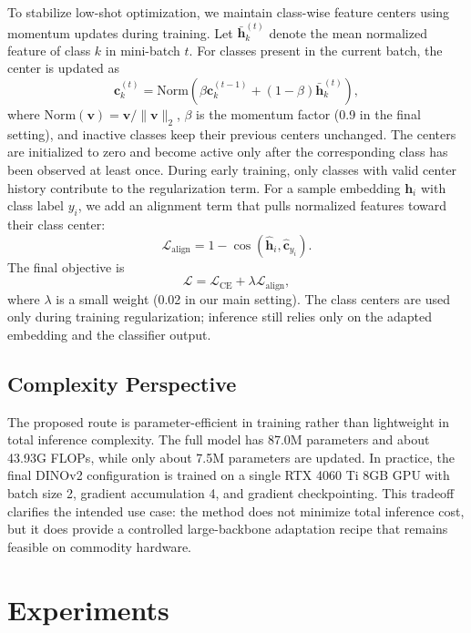 \documentclass[a4paper,fleqn]{cas-sc}
\begin{document}
To stabilize low-shot optimization, we maintain class-wise feature centers using momentum updates during training. Let $\bar{\mathbf{h}}_k^{(t)}$ denote the mean normalized feature of class $k$ in mini-batch $t$. For classes present in the current batch, the center is updated as
\begin{equation}
\mathbf{c}_k^{(t)} = \text{Norm}\left(\beta \mathbf{c}_k^{(t-1)} + (1-\beta)\bar{\mathbf{h}}_k^{(t)}\right),
\end{equation}
where $\text{Norm}(\mathbf{v})=\mathbf{v}/\|\mathbf{v}\|_2$, $\beta$ is the momentum factor (0.9 in the final setting), and inactive classes keep their previous centers unchanged. The centers are initialized to zero and become active only after the corresponding class has been observed at least once. During early training, only classes with valid center history contribute to the regularization term. For a sample embedding $\mathbf{h}_i$ with class label $y_i$, we add an alignment term that pulls normalized features toward their class center:
\begin{equation}
\mathcal{L}_{\text{align}} = 1 - \cos(\hat{\mathbf{h}}_i, \hat{\mathbf{c}}_{y_i}).
\end{equation}
The final objective is
\begin{equation}
\mathcal{L} = \mathcal{L}_{\text{CE}} + \lambda \mathcal{L}_{\text{align}},
\end{equation}
where $\lambda$ is a small weight (0.02 in our main setting). The class centers are used only during training regularization; inference still relies only on the adapted embedding and the classifier output.

\subsection{Complexity Perspective}

The proposed route is parameter-efficient in training rather than lightweight in total inference complexity. The full model has 87.0M parameters and about 43.93G FLOPs, while only about 7.5M parameters are updated. In practice, the final DINOv2 configuration is trained on a single RTX 4060 Ti 8GB GPU with batch size 2, gradient accumulation 4, and gradient checkpointing. This tradeoff clarifies the intended use case: the method does not minimize total inference cost, but it does provide a controlled large-backbone adaptation recipe that remains feasible on commodity hardware.

\section{Experiments}
\label{sec:experiments}
\end{document}
